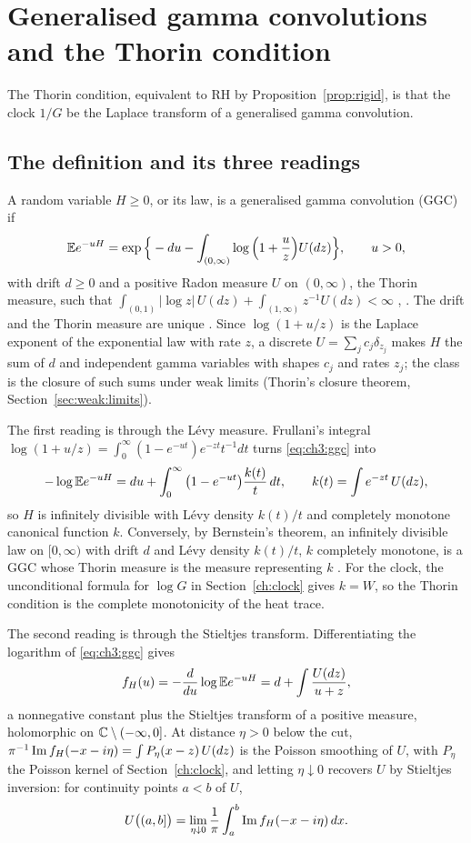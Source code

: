 \section{Generalised gamma convolutions and the Thorin condition}\label{ch:ggc}

The Thorin condition, equivalent to RH by Proposition~\ref{prop:rigid}, is that the clock $1/G$ be the Laplace transform of a generalised gamma convolution.

\subsection{The definition and its three readings}\label{sec:ch3:readings}

A random variable $H\ge0$, or its law, is a generalised gamma convolution (GGC) if
\begin{equation}\label{eq:ch3:ggc}
\mathbb{E} e^{-uH}=\exp\Big\{-du-\int_{(0,\infty)}\log\Big(1+\frac uz\Big)U(dz)\Big\},\qquad u>0,
\end{equation}
with drift $d\ge0$ and a positive Radon measure $U$ on $(0,\infty)$, the Thorin measure, such that $\int_{(0,1)}|\log z|\,U(dz)+\int_{(1,\infty)}z^{-1}U(dz)<\infty$ \cite{Thorin77a,Thorin}, \cite[p.~29]{Bondesson}. The drift and the Thorin measure are unique \cite[p.~30]{Bondesson}. Since $\log(1+u/z)$ is the Laplace exponent of the exponential law with rate $z$, a discrete $U=\sum_jc_j\delta_{z_j}$ makes $H$ the sum of $d$ and independent gamma variables with shapes $c_j$ and rates $z_j$; the class is the closure of such sums under weak limits (Thorin's closure theorem, Section~\ref{sec:weak:limits}).

The first reading is through the L\'evy measure. Frullani's integral $\log(1+u/z)=\int_0^\infty(1-e^{-ut})e^{-zt}t^{-1}dt$ turns \eqref{eq:ch3:ggc} into
\[
-\log\mathbb{E} e^{-uH}=du+\int_0^\infty\big(1-e^{-ut}\big)\frac{k(t)}t\,dt,\qquad k(t)=\int e^{-zt}\,U(dz),
\]
so $H$ is infinitely divisible with L\'evy density $k(t)/t$ and completely monotone canonical function $k$. Conversely, by Bernstein's theorem, an infinitely divisible law on $[0,\infty)$ with drift $d$ and L\'evy density $k(t)/t$, $k$ completely monotone, is a GGC whose Thorin measure is the measure representing $k$ \cite[Section 1.2]{JRY}. For the clock, the unconditional formula for $\log G$ in Section~\ref{ch:clock} gives $k=W$, so the Thorin condition is the complete monotonicity of the heat trace.

The second reading is through the Stieltjes transform. Differentiating the logarithm of \eqref{eq:ch3:ggc} gives
\[
f_H(u)=-\frac{d}{du}\log\mathbb{E} e^{-uH}=d+\int\frac{U(dz)}{u+z},
\]
a nonnegative constant plus the Stieltjes transform of a positive measure, holomorphic on $\mathbb{C}\setminus(-\infty,0]$. At distance $\eta>0$ below the cut, $\pi^{-1}\operatorname{Im} f_H(-x-i\eta)=\int P_\eta(x-z)\,U(dz)$ is the Poisson smoothing of $U$, with $P_\eta$ the Poisson kernel of Section~\ref{ch:clock}, and letting $\eta\downarrow0$ recovers $U$ by Stieltjes inversion: for continuity points $a<b$ of $U$,
\begin{equation}\label{eq:ch3:inversion}
U\big((a,b]\big)=\lim_{\eta\downarrow0}\frac1\pi\int_a^b\operatorname{Im} f_H(-x-i\eta)\,dx.
\end{equation}

